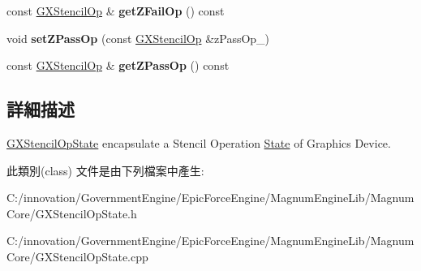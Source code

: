 \begin{DoxyCompactItemize}
\item 
const \hyperlink{class_i_dream_sky_1_1_g_x_stencil_op}{G\+X\+Stencil\+Op} \& {\bfseries get\+Z\+Fail\+Op} () const \hypertarget{class_i_dream_sky_1_1_g_x_stencil_op_state_ae93d4d758934fa5ae5a44344b39099f6}{}\label{class_i_dream_sky_1_1_g_x_stencil_op_state_ae93d4d758934fa5ae5a44344b39099f6}

\item 
void {\bfseries set\+Z\+Pass\+Op} (const \hyperlink{class_i_dream_sky_1_1_g_x_stencil_op}{G\+X\+Stencil\+Op} \&z\+Pass\+Op\+\_\+)\hypertarget{class_i_dream_sky_1_1_g_x_stencil_op_state_abab4c683ccf57f10d1071273dd6c10c2}{}\label{class_i_dream_sky_1_1_g_x_stencil_op_state_abab4c683ccf57f10d1071273dd6c10c2}

\item 
const \hyperlink{class_i_dream_sky_1_1_g_x_stencil_op}{G\+X\+Stencil\+Op} \& {\bfseries get\+Z\+Pass\+Op} () const \hypertarget{class_i_dream_sky_1_1_g_x_stencil_op_state_ac08a704fafdd984f21778c99bae0d4c1}{}\label{class_i_dream_sky_1_1_g_x_stencil_op_state_ac08a704fafdd984f21778c99bae0d4c1}

\end{DoxyCompactItemize}


\subsection{詳細描述}
\hyperlink{class_i_dream_sky_1_1_g_x_stencil_op_state}{G\+X\+Stencil\+Op\+State} encapsulate a Stencil Operation \hyperlink{class_i_dream_sky_1_1_state}{State} of Graphics Device. 

此類別(class) 文件是由下列檔案中產生\+:\begin{DoxyCompactItemize}
\item 
C\+:/innovation/\+Government\+Engine/\+Epic\+Force\+Engine/\+Magnum\+Engine\+Lib/\+Magnum\+Core/G\+X\+Stencil\+Op\+State.\+h\item 
C\+:/innovation/\+Government\+Engine/\+Epic\+Force\+Engine/\+Magnum\+Engine\+Lib/\+Magnum\+Core/G\+X\+Stencil\+Op\+State.\+cpp\end{DoxyCompactItemize}
